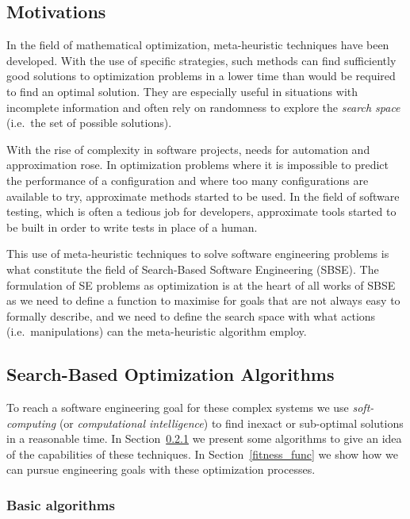 \documentclass[11pt]{sdm}
\begin{document}
\subsection{Motivations}
\label{motiv}
In the field of mathematical optimization, meta-heuristic techniques have been developed.
With the use of specific strategies, such methods can find sufficiently good solutions to optimization problems in a lower time than would be required to find an optimal solution.
They are especially useful in situations with incomplete information and often rely on randomness to explore the \textit{search space} (i.e.\ the set of possible solutions).

With the rise of complexity in software projects, needs for automation and approximation rose.
In optimization problems where it is impossible to predict the performance of a configuration and where too many configurations are available to try, approximate methods started to be used.
In the field of software testing, which is often a tedious job for developers, approximate tools started to be built in order to write tests in place of a human.

This use of meta-heuristic techniques to solve software engineering problems is what constitute the field of Search-Based Software Engineering (SBSE).
The formulation of SE problems as optimization is at the heart of all works of SBSE as we need to define a function to maximise for goals that are not always easy to formally describe, and we need to define the search space with what actions (i.e.\ manipulations) can the meta-heuristic algorithm employ.

\subsection{Search-Based Optimization Algorithms}
\label{example_algo}
To reach a software engineering goal for these complex systems we use \textit{soft-computing} (or \textit{computational intelligence}) to find inexact or sub-optimal solutions in a reasonable time.
In Section~\ref{basic_algo} we present some algorithms to give an idea of the capabilities of these techniques.
In Section~\ref{fitness_func} we show how we can pursue engineering goals with these optimization processes.

\subsubsection{Basic algorithms}
\label{basic_algo}
\end{document}
